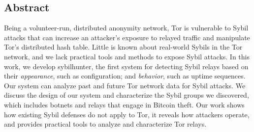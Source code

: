 \subsection*{Abstract}
Being a volunteer-run, distributed anonymity network, Tor is vulnerable to Sybil
attacks that can increase an attacker's exposure to relayed traffic and
manipulate Tor's distributed hash table.  Little is known about real-world
Sybils in the Tor network, and we lack practical tools and methods to expose
Sybil attacks.
%
In this work, we develop sybilhunter, the first system for detecting Sybil
relays based on their \emph{appearance}, such as configuration; and
\emph{behavior}, such as uptime sequences.  Our system can analyze past and
future Tor network data for Sybil attacks.  We discuss the design of our system
and characterize the Sybil groups we discovered, which includes botnets and
relays that engage in Bitcoin theft.
%
Our work shows how existing Sybil defenses do not apply to Tor, it reveals how
attackers operate, and provides practical tools to analyze and characterize Tor
relays.

